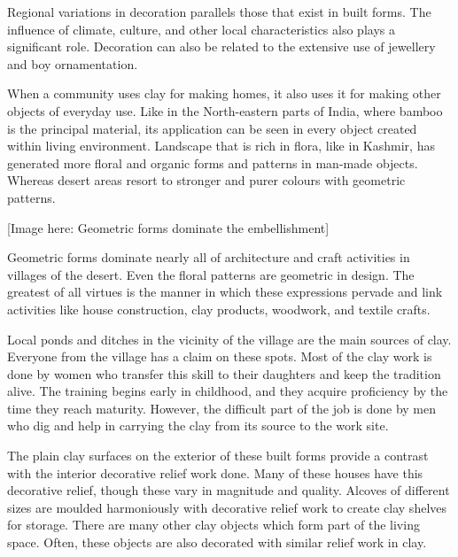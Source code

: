 Regional variations in decoration parallels those that exist in built forms. The influence of climate, culture, and other local characteristics also plays a significant role. Decoration can also be related to the extensive use of jewellery and boy ornamentation.

When a community uses clay for making homes, it also uses it for making other objects of everyday use. Like in the North-eastern parts of India, where bamboo is the principal material, its application can be seen in every object created within living environment. Landscape that is rich in flora, like in Kashmir, has generated more floral and organic forms and patterns in man-made objects. Whereas desert areas resort to stronger and purer colours with geometric patterns.

[Image here: Geometric forms dominate the embellishment]

Geometric forms dominate nearly all of architecture and craft activities in villages of the desert. Even the floral patterns are geometric in design. The greatest of all virtues is the manner in which these expressions pervade and link activities like house construction, clay products, woodwork, and textile crafts.

Local ponds and ditches in the vicinity of the village are the main sources of clay. Everyone from the village has a claim on these spots. Most of the clay work is done by women who transfer this skill to their daughters and keep the tradition alive. The training begins early in childhood, and they acquire proficiency by the time they reach maturity. However, the difficult part of the job is done by men who dig and help in carrying the clay from its source to the work site.

The plain clay surfaces on the exterior of these built forms provide a contrast with the interior decorative relief work done. Many of these houses have this decorative relief, though these vary in magnitude and quality. Alcoves of different sizes are moulded harmoniously with decorative relief work to create clay shelves for storage. There are many other clay objects which form part of the living space. Often, these objects are also decorated with similar relief work in clay.


